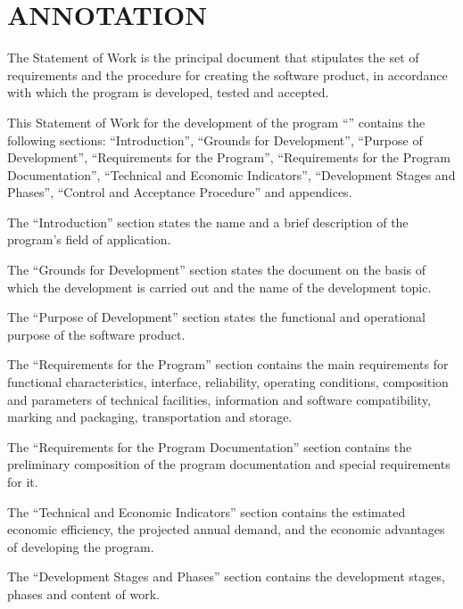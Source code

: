 \documentclass[12pt,a4paper]{extarticle}
\begin{document}
\sloppy



\section*{ANNOTATION}

The Statement of Work is the principal document that stipulates the set of requirements and the procedure for creating the software product, in accordance with which the program is developed, tested and accepted.

This Statement of Work for the development of the program \enquote{\hseProjectName} contains the following sections: \enquote{Introduction}, \enquote{Grounds for Development}, \enquote{Purpose of Development}, \enquote{Requirements for the Program}, \enquote{Requirements for the Program Documentation}, \enquote{Technical and Economic Indicators}, \enquote{Development Stages and Phases}, \enquote{Control and Acceptance Procedure} and appendices\cite{gost19101}.

The \enquote{Introduction} section states the name and a brief description of the program's field of application.

The \enquote{Grounds for Development} section states the document on the basis of which the development is carried out and the name of the development topic.

The \enquote{Purpose of Development} section states the functional and operational purpose of the software product.

The \enquote{Requirements for the Program} section contains the main requirements for functional characteristics, interface, reliability, operating conditions, composition and parameters of technical facilities, information and software compatibility, marking and packaging, transportation and storage.

The \enquote{Requirements for the Program Documentation} section contains the preliminary composition of the program documentation and special requirements for it.

The \enquote{Technical and Economic Indicators} section contains the estimated economic efficiency, the projected annual demand, and the economic advantages of developing the program.

The \enquote{Development Stages and Phases} section contains the development stages, phases and content of work.
\end{document}
